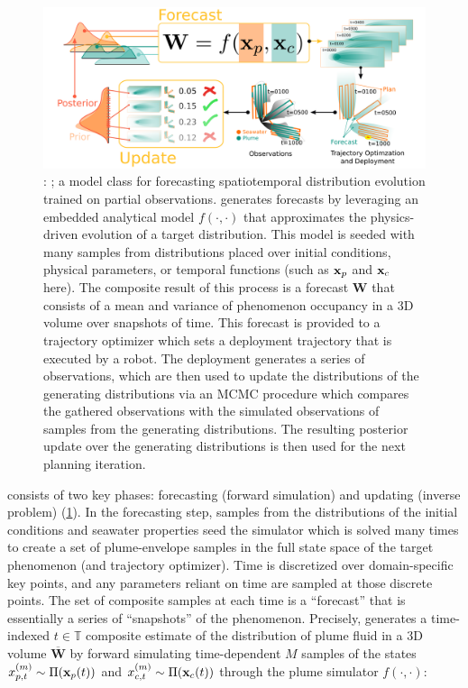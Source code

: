 \begin{figure}[h!]
    \centering
    \includegraphics[width=1\columnwidth]{figures/phumes_diagram.png}
    \caption{\PHUMES: \phumes; a model class for forecasting spatiotemporal distribution evolution trained on partial observations. \PHUMES generates forecasts by leveraging an embedded analytical model $f(\cdot, \cdot)$ that approximates the physics-driven evolution of a target distribution. This model is seeded with many samples from distributions placed over initial conditions, physical parameters, or temporal functions (such as $\mathbf{x}_p$ and $\mathbf{x}_c$ here). The composite result of this process is a forecast $\mathbf{W}$ that consists of a mean and variance of phenomenon occupancy in a 3D volume over snapshots of time. This forecast is provided to a trajectory optimizer which sets a deployment trajectory that is executed by a robot. The deployment generates a series of observations, which are then used to update the distributions of the generating distributions via an MCMC procedure which compares the gathered observations with the simulated observations of samples from the generating distributions. The resulting posterior update over the generating distributions is then used for the next planning iteration.}
    \label{fig:phumes}
\end{figure}

\PHUMES consists of two key phases: forecasting (forward simulation) and updating (inverse problem) (\cref{fig:phumes}). In the forecasting step, samples from the distributions of the initial conditions and seawater properties seed the simulator which is solved many times to create a set of plume-envelope samples in the full state space of the target phenomenon (and trajectory optimizer). Time is discretized over domain-specific key points, and any parameters reliant on time are sampled at those discrete points. The set of composite samples at each time is a ``forecast'' that is essentially a series of ``snapshots'' of the phenomenon. Precisely, \PHUMES generates a time-indexed $t \in \mathbb{T}$ composite estimate of the distribution of plume fluid in a 3D volume $\overbar{\mathbf{W}}$ by forward simulating time-dependent $M$ samples of the states $x_{p,t}^{(m)} \sim \Pi(\mathbf{x}_p(t))$ and $x_{c,t}^{(m)} \sim \Pi(\mathbf{x}_c(t))$ through the plume simulator $f(\cdot, \cdot)$:

